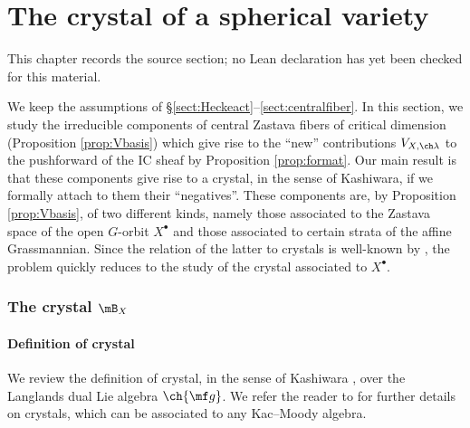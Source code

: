 \chapter{The crystal of a spherical variety}
\label{intersection-complexes-unramified-l-factors-chapter-07}

\begin{remark}
\label{intersection-complexes-unramified-l-factors-chapter-07-source}
This chapter records the source section; no Lean declaration has yet been checked for this material.
\notready
\end{remark}

\label{sect:crystal}

We keep the assumptions of \S\ref{sect:Heckeact}--\ref{sect:centralfiber}. In this section, we study the irreducible components of central Zastava fibers of critical dimension (Proposition \ref{prop:Vbasis}) which give rise to the ``new'' contributions $V_{X,\ch\lambda}$ to the pushforward of the IC sheaf by Proposition \ref{prop:format}. Our main result is that these components give rise to a crystal, in the sense of Kashiwara, if we formally attach to them their ``negatives''. These components are, by Proposition \ref{prop:Vbasis}, of two different kinds, namely those associated to the Zastava space of the open $G$-orbit $X^\bullet$ and those associated to certain strata of the affine Grassmannian. Since the relation of the latter to crystals is well-known by
\cite{BGcrys,BFG}, the problem quickly reduces to the study of the crystal associated to $X^\bullet$.



\subsection{The crystal $\mB_{X}$}

\subsubsection{Definition of crystal}
We review the definition of crystal, in the sense of Kashiwara \cite{Kas93},
over the Langlands dual Lie algebra $\ch{\mf g}$. We refer the reader to
\cite{Kas94,Kas95,BS,HK} for further details on crystals, which can be associated
to any Kac--Moody algebra.

